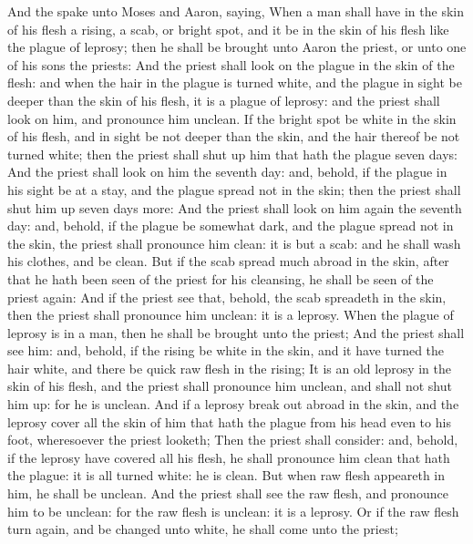 \begin{biblechapter} %
 And the \LORD spake unto Moses and Aaron, saying,
\verse When a man shall have in the skin of his flesh a rising, a scab, or bright spot, and it be in the skin of his flesh like the plague of leprosy; then he shall be brought unto Aaron the priest, or unto one of his sons the priests:
\verse And the priest shall look on the plague in the skin of the flesh: and when the hair in the plague is turned white, and the plague in sight be deeper than the skin of his flesh, it is a plague of leprosy: and the priest shall look on him, and pronounce him unclean.
\verse If the bright spot be white in the skin of his flesh, and in sight be not deeper than the skin, and the hair thereof be not turned white; then the priest shall shut up him that hath the plague seven days:
\verse And the priest shall look on him the seventh day: and, behold, if the plague in his sight be at a stay, and the plague spread not in the skin; then the priest shall shut him up seven days more:
\verse And the priest shall look on him again the seventh day: and, behold, if the plague be somewhat dark, and the plague spread not in the skin, the priest shall pronounce him clean: it is but a scab: and he shall wash his clothes, and be clean.
\verse But if the scab spread much abroad in the skin, after that he hath been seen of the priest for his cleansing, he shall be seen of the priest again:
\verse And if the priest see that, behold, the scab spreadeth in the skin, then the priest shall pronounce him unclean: it is a leprosy.
\verse When the plague of leprosy is in a man, then he shall be brought unto the priest;
\verse And the priest shall see him: and, behold, if the rising be white in the skin, and it have turned the hair white, and there be quick raw flesh in the rising;
\verse It is an old leprosy in the skin of his flesh, and the priest shall pronounce him unclean, and shall not shut him up: for he is unclean.
\verse And if a leprosy break out abroad in the skin, and the leprosy cover all the skin of him that hath the plague from his head even to his foot, wheresoever the priest looketh;
\verse Then the priest shall consider: and, behold, if the leprosy have covered all his flesh, he shall pronounce him clean that hath the plague: it is all turned white: he is clean.
\verse But when raw flesh appeareth in him, he shall be unclean.
\verse And the priest shall see the raw flesh, and pronounce him to be unclean: for the raw flesh is unclean: it is a leprosy.
\verse Or if the raw flesh turn again, and be changed unto white, he shall come unto the priest;

\end{biblechapter}
